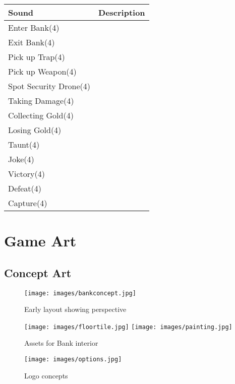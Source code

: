 \documentclass[10pt]{report}
\begin{document}
\begin{center}
    \begin{tabular}{| p{.45\linewidth} | p{.45\linewidth} |}
        \hline
        Sound & Description \\  \hline
        Enter Bank(4)   &   \\ \hline
        Exit Bank(4)    &   \\ \hline
        Pick up Trap(4) &   \\ \hline
        Pick up Weapon(4)   &   \\ \hline
        Spot Security Drone(4)  &   \\ \hline
        Taking Damage(4)    &   \\ \hline
        Collecting Gold(4)  &   \\ \hline
        Losing Gold(4)  &   \\ \hline
        Taunt(4)    &   \\ \hline
        Joke(4) &   \\ \hline
        Victory(4)  &   \\ \hline
        Defeat(4)   &   \\ \hline
        Capture(4)  &   \\ \hline
    \end{tabular}
\end{center}

\chapter{Game Art}

\section{Concept Art}

\begin{figure}[H]
	\texttt{[image: images/bankconcept.jpg]}
    \caption{Early layout showing perspective}
\end{figure}

\begin{figure}[H]
    \centering
    \texttt{[image: images/floortile.jpg]}
    \texttt{[image: images/painting.jpg]}
    \caption{Assets for Bank interior}
\end{figure}

\begin{figure}[H]
	\texttt{[image: images/options.jpg]}
    \caption{Logo concepts}
\end{figure}
\end{document}
